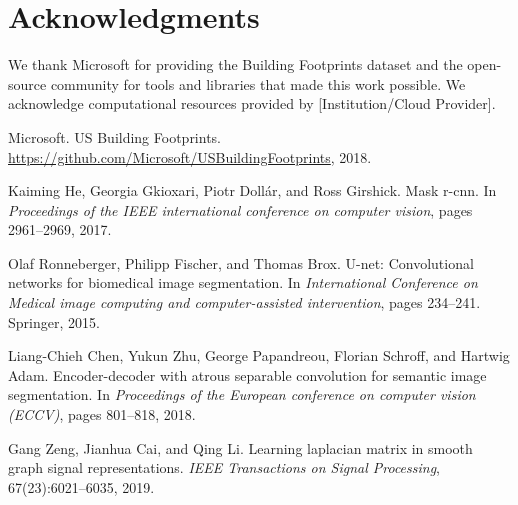 \documentclass{article}
\begin{document}
\section*{Acknowledgments}

We thank Microsoft for providing the Building Footprints dataset and the open-source community for tools and libraries that made this work possible. We acknowledge computational resources provided by [Institution/Cloud Provider].




\begin{thebibliography}{9}

Microsoft.
\newblock US Building Footprints.
\newblock \url{https://github.com/Microsoft/USBuildingFootprints}, 2018.

Kaiming He, Georgia Gkioxari, Piotr Dollár, and Ross Girshick.
\newblock Mask r-cnn.
\newblock In \textit{Proceedings of the IEEE international conference on computer vision}, pages 2961--2969, 2017.

Olaf Ronneberger, Philipp Fischer, and Thomas Brox.
\newblock U-net: Convolutional networks for biomedical image segmentation.
\newblock In \textit{International Conference on Medical image computing and computer-assisted intervention}, pages 234--241. Springer, 2015.

Liang-Chieh Chen, Yukun Zhu, George Papandreou, Florian Schroff, and Hartwig Adam.
\newblock Encoder-decoder with atrous separable convolution for semantic image segmentation.
\newblock In \textit{Proceedings of the European conference on computer vision (ECCV)}, pages 801--818, 2018.

Gang Zeng, Jianhua Cai, and Qing Li.
\newblock Learning laplacian matrix in smooth graph signal representations.
\newblock \textit{IEEE Transactions on Signal Processing}, 67(23):6021--6035, 2019.

\end{thebibliography}
\end{document}
